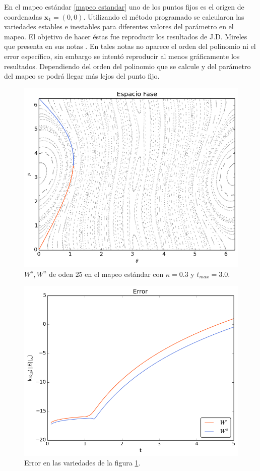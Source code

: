 En el mapeo estándar \ref{mapeo estandar} uno de los puntos fijos es el origen de coordenadas $\mathbf{x}_{1}=(0,0)$. Utilizando el método programado se calcularon las variedades estables e inestables para diferentes valores del parámetro en el mapeo. El objetivo de hacer éstas fue reproducir los resultados de J.D. Mireles que presenta en sus notas \cite{Mireles}. En tales notas no aparece el orden del polinomio ni el error específico, sin embargo se intentó reproducir al menos gráficamente los resultados. Dependiendo del orden del polinomio que se calcule y del parámetro del mapeo se podrá llegar más lejos del punto fijo.  
\begin{figure}[H]
 \centering
 \includegraphics[scale=0.6]{estandark03}
 \caption{$W^{s},W^{u}$ de oden $25$ en el mapeo estándar con $\kappa=0.3$ y $t_{max}=3.0$.}
 \label{estandar03}
\end{figure}

\begin{figure}[H]
\centering
\includegraphics[scale=0.6]{error_est_k03} 
\caption{Error en las variedades de la figura \ref{estandar03}.}
\label{error est k03}
\end{figure}



